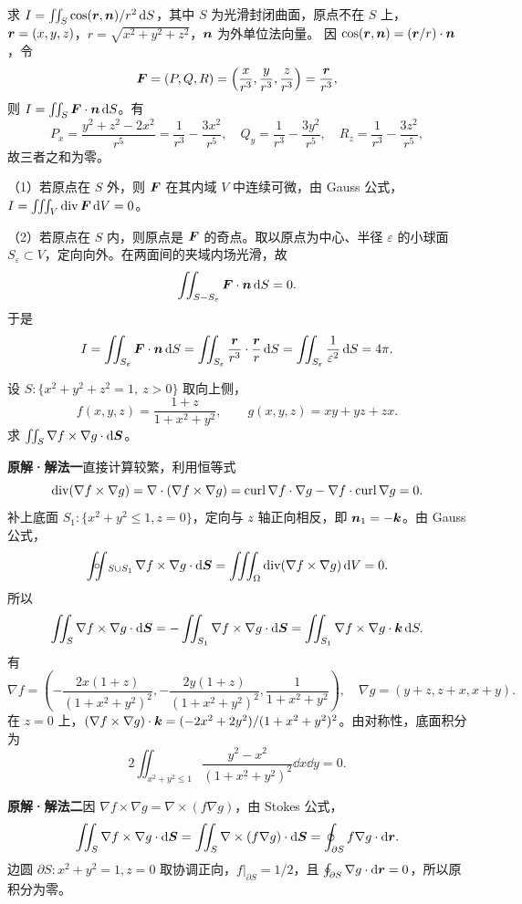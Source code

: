求 $I=\iint_S\cos(\bm{r},\bm{n})/r^2\mathop{}\!\mathrm d S$，其中 $S$ 为光滑封闭曲面，原点不在 $S$ 上，$\bm{r}=(x,y,z)$，$r=\sqrt{x^2+y^2+z^2}$，$\bm{n}$ 为外单位法向量。
\sol 因 $\cos(\bm{r},\bm{n})=(\bm{r}/r)\cdot\bm{n}$，令
\[
\bm{F}=(P,Q,R)=\left(\frac x{r^3},\frac y{r^3},\frac z{r^3}\right)=\frac{\bm{r}}{r^3},
\]
则 $I=\iint_S\bm{F}\cdot\bm{n}\mathop{}\!\mathrm d S$。有
\[
P_x=\frac{y^2+z^2-2x^2}{r^5}=\frac1{r^3}-\frac{3x^2}{r^5},\quad
Q_y=\frac1{r^3}-\frac{3y^2}{r^5},\quad R_z=\frac1{r^3}-\frac{3z^2}{r^5},
\]
故三者之和为零。

（1）若原点在 $S$ 外，则 $\bm{F}$ 在其内域 $V$ 中连续可微，由 Gauss 公式，$I=\iiint_V\operatorname{div}\bm{F}\mathop{}\!\mathrm d V=0$。

（2）若原点在 $S$ 内，则原点是 $\bm{F}$ 的奇点。取以原点为中心、半径 $\varepsilon$ 的小球面 $S_\varepsilon\subset V$，定向向外。在两面间的夹域内场光滑，故
\[
\iint_{S-S_\varepsilon}\bm{F}\cdot\bm{n}\mathop{}\!\mathrm d S=0.
\]
于是
\[
I=\iint_{S_\varepsilon}\bm{F}\cdot\bm{n}\mathop{}\!\mathrm d S
=\iint_{S_\varepsilon}\frac{\bm{r}}{r^3}\cdot\frac{\bm{r}}r\mathop{}\!\mathrm d S
=\iint_{S_\varepsilon}\frac1{\varepsilon^2}\mathop{}\!\mathrm d S=4\pi.
\]

设 $S:\{x^2+y^2+z^2=1,\ z>0\}$ 取向上侧，
\[
f(x,y,z)=\frac{1+z}{1+x^2+y^2},\qquad g(x,y,z)=xy+yz+zx.
\]
求 $\iint_S\nabla f\times\nabla g\cdot\mathop{}\!\mathrm d\bm{S}$。
\par\textbf{原解·解法一}\quad 直接计算较繁，利用恒等式
\[
\operatorname{div}(\nabla f\times\nabla g)
=\nabla\cdot(\nabla f\times\nabla g)
=\operatorname{curl}\nabla f\cdot\nabla g-\nabla f\cdot\operatorname{curl}\nabla g=0.
\]
补上底面 $S_1:\{x^2+y^2\le1,z=0\}$，定向与 $z$ 轴正向相反，即 $\bm{n}_1=-\bm{k}$。由 Gauss 公式，
\[
\oiint_{S\cup S_1}\nabla f\times\nabla g\cdot\dd\vct S
=\iiint_\Omega\diver(\nabla f\times\nabla g)\dd V=0.
\]
所以
\[
\iint_S\nabla f\times\nabla g\cdot\mathop{}\!\mathrm d\bm{S}
=-\iint_{S_1}\nabla f\times\nabla g\cdot\mathop{}\!\mathrm d\bm{S}
=\iint_{S_1}\nabla f\times\nabla g\cdot\bm{k}\mathop{}\!\mathrm d S.
\]
有
\[
\nabla f=\left(-\frac{2x(1+z)}{(1+x^2+y^2)^2},-\frac{2y(1+z)}{(1+x^2+y^2)^2},\frac1{1+x^2+y^2}\right),
\quad\nabla g=(y+z,z+x,x+y).
\]
在 $z=0$ 上，$(\nabla f\times\nabla g)\cdot\bm{k}=(-2x^2+2y^2)/(1+x^2+y^2)^2$。由对称性，底面积分为
\[
2\iint_{x^2+y^2\le1}\frac{y^2-x^2}{(1+x^2+y^2)^2}\dd x\dd y=0.
\]
\par\textbf{原解·解法二}\quad 因 $\nabla f\times\nabla g=\nabla\times(f\nabla g)$，由 Stokes 公式，
\[
\iint_S\nabla f\times\nabla g\cdot\mathop{}\!\mathrm d\bm{S}
=\iint_S\nabla\times(f\nabla g)\cdot\mathop{}\!\mathrm d\bm{S}
=\oint_{\partial S}f\nabla g\cdot\mathop{}\!\mathrm d\bm{r}.
\]
边圆 $\partial S:x^2+y^2=1,z=0$ 取协调正向，$f|_{\partial S}=1/2$，且 $\oint_{\partial S}\nabla g\cdot\mathop{}\!\mathrm d\bm{r}=0$，所以原积分为零。

